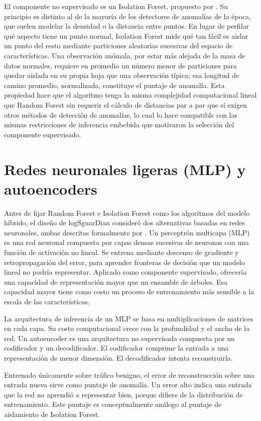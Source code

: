 El componente no supervisado es un Isolation Forest, propuesto por \textcite{liu2008}. Su principio es distinto al de la mayoría de los detectores de anomalías de la época, que suelen modelar la densidad o la distancia entre puntos. En lugar de perfilar qué aspecto tiene un punto normal, Isolation Forest mide qué tan fácil es aislar un punto del resto mediante particiones aleatorias sucesivas del espacio de características. Una observación anómala, por estar más alejada de la masa de datos normales, requiere en promedio un número menor de particiones para quedar aislada en su propia hoja que una observación típica; esa longitud de camino promedio, normalizada, constituye el puntaje de anomalía. Esta propiedad hace que el algoritmo tenga la misma complejidad computacional lineal que Random Forest sin requerir el cálculo de distancias par a par que sí exigen otros métodos de detección de anomalías, lo cual lo hace compatible con las mismas restricciones de inferencia embebida que motivaron la selección del componente supervisado.

\section{Redes neuronales ligeras (MLP) y autoencoders}

Antes de fijar Random Forest e Isolation Forest como los algoritmos del modelo híbrido, el diseño de logSguarDian consideró dos alternativas basadas en redes neuronales, ambas descritas formalmente por \textcite{goodfellow2016}. Un perceptrón multicapa (MLP) es una red neuronal compuesta por capas densas sucesivas de neuronas con una función de activación no lineal. Se entrena mediante descenso de gradiente y retropropagación del error, para aprender fronteras de decisión que un modelo lineal no podría representar. Aplicado como componente supervisado, ofrecería una capacidad de representación mayor que un ensamble de árboles. Esa capacidad mayor tiene como costo un proceso de entrenamiento más sensible a la escala de las características.

La arquitectura de inferencia de un MLP se basa en multiplicaciones de matrices en cada capa. Su costo computacional crece con la profundidad y el ancho de la red. Un autoencoder es una arquitectura no supervisada compuesta por un codificador y un decodificador. El codificador comprime la entrada a una representación de menor dimensión. El decodificador intenta reconstruirla.

Entrenado únicamente sobre tráfico benigno, el error de reconstrucción sobre una entrada nueva sirve como puntaje de anomalía. Un error alto indica una entrada que la red no aprendió a representar bien, porque difiere de la distribución de entrenamiento. Este puntaje es conceptualmente análogo al puntaje de aislamiento de Isolation Forest.

